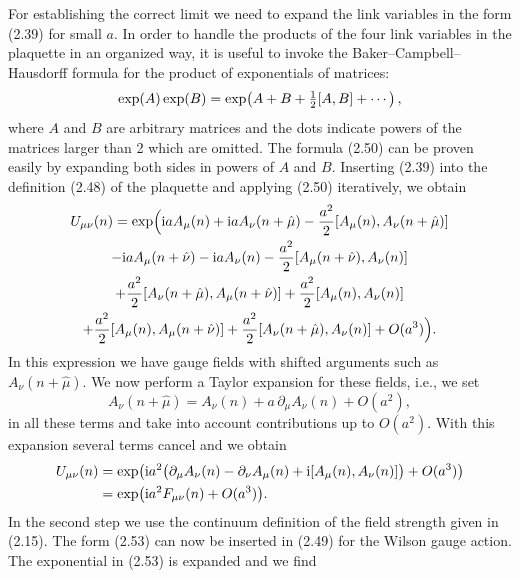 For establishing the correct limit we need to expand the link variables in
the form (2.39) for small $a$. In order to handle the products of the four
link variables in the plaquette in an organized way, it is useful to invoke
the Baker--Campbell--Hausdorff formula for the product of exponentials of
matrices:
\begin{equation}
  \exp(A) \exp(B) = \exp\!\left( A + B + \tfrac{1}{2} [A, B] + \cdots \right) ,
\end{equation}
where $A$ and $B$ are arbitrary matrices and the dots indicate powers of the
matrices larger than 2 which are omitted. The formula (2.50) can be proven
easily by expanding both sides in powers of $A$ and $B$. Inserting (2.39)
into the definition (2.48) of the plaquette and applying (2.50) iteratively,
we obtain
\begin{multline}
  U_{\mu\nu}(n) = \exp\!\Big(
    \mathrm{i} a A_\mu(n) + \mathrm{i} a A_\nu(n + \hat\mu)
    - \frac{a^2}{2} [A_\mu(n), A_\nu(n + \hat\mu)] \\
    - \mathrm{i} a A_\mu(n + \hat\nu) - \mathrm{i} a A_\nu(n)
    - \frac{a^2}{2} [A_\mu(n + \hat\nu), A_\nu(n)] \\
    + \frac{a^2}{2} [A_\nu(n + \hat\mu), A_\mu(n + \hat\nu)]
    + \frac{a^2}{2} [A_\mu(n), A_\nu(n)] \\
    + \frac{a^2}{2} [A_\mu(n), A_\mu(n + \hat\nu)]
    + \frac{a^2}{2} [A_\nu(n + \hat\mu), A_\nu(n)] + O(a^3) \Big) .
\end{multline}
In this expression we have gauge fields with shifted arguments such as
$A_\nu(n + \hat\mu)$. We now perform a Taylor expansion for these fields,
i.e., we set
\begin{equation}
  A_\nu(n + \hat\mu) = A_\nu(n) + a\, \partial_\mu A_\nu(n) + O(a^2) ,
\end{equation}
in all these terms and take into account contributions up to $O(a^2)$. With
this expansion several terms cancel and we obtain
\begin{equation}
  \begin{split}
    U_{\mu\nu}(n) &= \exp\!\big( \mathrm{i} a^2
      \big(\partial_\mu A_\nu(n) - \partial_\nu A_\mu(n)
      + \mathrm{i} [A_\mu(n), A_\nu(n)]\big) + O(a^3) \big) \\
    &= \exp\!\big( \mathrm{i} a^2 F_{\mu\nu}(n) + O(a^3) \big) .
  \end{split}
\end{equation}
In the second step we use the continuum definition of the field strength
given in (2.15). The form (2.53) can now be inserted in (2.49) for the
Wilson gauge action. The exponential in (2.53) is expanded and we find
